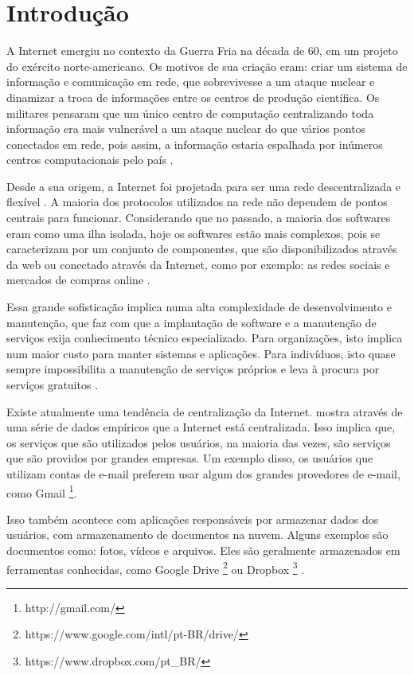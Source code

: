 \chapter{Introdução}
\label{cap-introducao}

A Internet emergiu no contexto da Guerra Fria na década
de 60, em um projeto do exército norte-americano. Os motivos de sua criação eram:
criar um sistema de informação e comunicação em rede, que
sobrevivesse a um ataque nuclear e dinamizar a troca de informações entre os centros de
produção científica. Os militares pensaram que um único centro de computação
centralizando toda informação era mais vulnerável a um ataque nuclear do que vários
pontos conectados em rede, pois assim, a informação estaria espalhada por inúmeros
centros computacionais pelo país \cite{giles2010psychology}.

Desde a sua origem, a Internet foi projetada para ser uma rede
descentralizada e flexível \cite{galaxia}. A maioria dos protocolos
utilizados na rede não dependem de pontos centrais para funcionar. 
Considerando que no
passado, a maioria dos softwares eram como uma ilha isolada, hoje os softwares 
estão mais complexos, pois se caracterizam por um conjunto de componentes, que 
são disponibilizados através da web ou conectado através da Internet,
como por exemplo: as redes sociais e mercados de compras online \cite{byhand}.

Essa grande sofisticação implica numa alta complexidade de
desenvolvimento e manutenção, que faz com que a
implantação de software e a manutenção de serviços exija conhecimento técnico
especializado. Para organizações, isto implica num maior
custo para manter sistemas e aplicações. Para indivíduos, isto quase sempre
impossibilita a manutenção de serviços próprios e leva à procura por serviços
gratuitos \cite{shak2015}.

Existe atualmente uma tendência de centralização da Internet. 
mostra
através de uma série de dados empíricos que a Internet está centralizada. Isso
implica que, os serviços que são utilizados pelos usuários, na maioria
das vezes, são serviços que são providos por grandes empresas. 
Um exemplo disso, os usuários que utilizam contas de e-mail preferem usar algum
dos grandes provedores de e-mail, como Gmail \footnote{http://gmail.com/}. 

Isso também acontece com aplicações responsáveis por armazenar dados dos usuários,
com armazenamento de documentos na nuvem. Alguns exemplos são 
documentos como: fotos, vídeos e arquivos. Eles são geralmente armazenados em 
ferramentas conhecidas, como Google Drive 
\footnote{https://www.google.com/intl/pt-BR/drive/} ou Dropbox \footnote{https://www.dropbox.com/pt\_BR/}
. 

